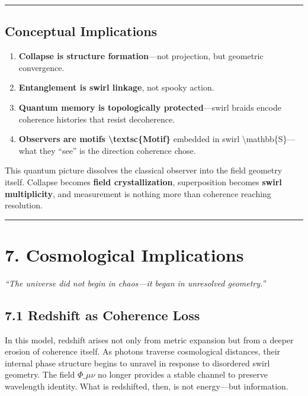 \documentclass[
  11pt,
]{article}
\providecommand{\tightlist}{%
  \setlength{\itemsep}{0pt}\setlength{\parskip}{0pt}}
\begin{document}
\begin{center}\rule{0.5\linewidth}{0.5pt}\end{center}

\subsection{Conceptual Implications}\label{conceptual-implications}

\begin{enumerate}
\def\labelenumi{\arabic{enumi}.}
\tightlist
\item
  \textbf{Collapse is structure formation}---not projection, but
  geometric convergence.
\item
  \textbf{Entanglement is swirl linkage}, not spooky action.
\item
  \textbf{Quantum memory is topologically protected}---swirl braids
  encode coherence histories that resist decoherence.
\item
  \textbf{Observers are motifs \textbackslash textsc\{Motif\}} embedded
  in swirl \textbackslash mathbb\{S\}---what they ``see'' is the
  direction coherence chose.
\end{enumerate}

This quantum picture dissolves the classical observer into the field
geometry itself. Collapse becomes \textbf{field crystallization},
superposition becomes \textbf{swirl multiplicity}, and measurement is
nothing more than coherence reaching resolution.

\begin{center}\rule{0.5\linewidth}{0.5pt}\end{center}

\section{7. Cosmological Implications}\label{cosmological-implications}

\emph{``The universe did not begin in chaos---it began in unresolved
geometry.''}

\subsection{7.1 Redshift as Coherence
Loss}\label{redshift-as-coherence-loss}

In this model, redshift arises not only from metric expansion but from a
deeper erosion of coherence itself. As photons traverse cosmological
distances, their internal phase structure begins to unravel in response
to disordered swirl geometry. The field \(\Phi\_{\mu\nu}\) no longer
provides a stable channel to preserve wavelength identity. What is
redshifted, then, is not energy---but information.
\end{document}

